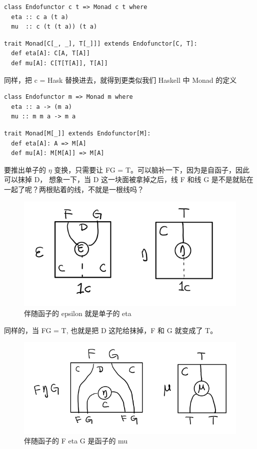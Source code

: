 \documentclass[letterspacing]{tufte-book}
\begin{document}
\lstset{language=haskell,label= ,caption= ,captionpos=b,numbers=none}
\begin{lstlisting}
class Endofunctor c t => Monad c t where
  eta :: c a (t a)
  mu  :: c (t (t a)) (t a)
\end{lstlisting}

\lstset{language=scala,label= ,caption= ,captionpos=b,numbers=none}
\begin{lstlisting}
trait Monad[C[_, _], T[_]]] extends Endofunctor[C, T]:
  def eta[A]: C[A, T[A]]
  def mu[A]: C[T[T[A]], T[A]]
\end{lstlisting}
同样，把 c = Hask 替换进去，就得到更类似我们 Haskell 中 Monad 的定义
\lstset{language=haskell,label= ,caption= ,captionpos=b,numbers=none}
\begin{lstlisting}
class Endofunctor m => Monad m where
  eta :: a -> (m a)
  mu :: m m a -> m a
\end{lstlisting}

\lstset{language=scala,label= ,caption= ,captionpos=b,numbers=none}
\begin{lstlisting}
trait Monad[M[_]] extends Endofunctor[M]:
  def eta[A]: A => M[A]
  def mu[A]: M[M[A]] => M[A]
\end{lstlisting}
要推出单子的 \(\eta\) 变换，只需要让 FG = T。可以脑补一下，因为是自函子，因此可以抹掉 D，
想象一下，当 D 这一块面被拿掉之后，线 F 和线 G 是不是就贴在一起了呢？两根贴着的线，不就是一根线吗？

\begin{figure}[htbp]
\centering
\includegraphics[width=.9\linewidth]{images/p1-ajunction-functor-to-monad-eta.png}
\caption{伴随函子的 epsilon 就是单子的 eta}
\end{figure}

同样的，当 FG = T, 也就是把 D 这陀给抹掉，F 和 G 就变成了 T。
\begin{figure}[htbp]
\centering
\includegraphics[width=.9\linewidth]{images/p1-ajunction-functor-to-monad-mu.png}
\caption{伴随函子的 F eta G 是函子的 mu}
\end{figure}
\end{document}
